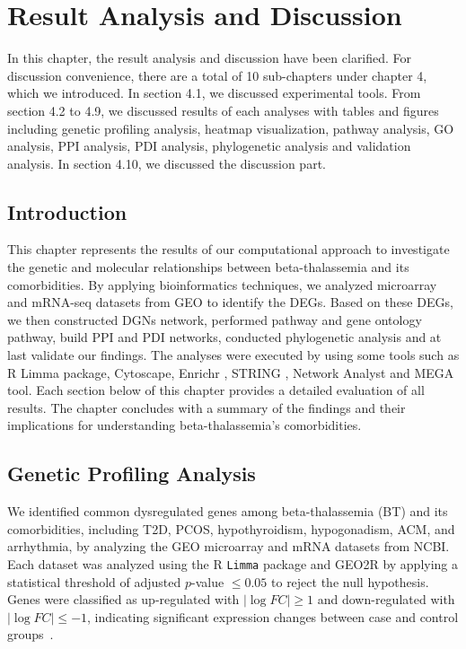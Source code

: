%
%
\let\textcircled=\pgftextcircled
\chapter{Result Analysis and Discussion}
\label{chap:implementation}
In this chapter, the result analysis and discussion have been clarified. For discussion convenience, there are a total of 10 sub-chapters under chapter 4, which we introduced. In section 4.1, we discussed experimental tools. From section 4.2 to 4.9, we discussed results of each analyses with tables and figures including genetic profiling analysis, heatmap visualization, pathway analysis, GO analysis, PPI analysis, PDI analysis, phylogenetic analysis and validation analysis. In section 4.10, we discussed the discussion part.

\vspace{150mm}

\section{Introduction}
\label{sec:sec4_1}
This chapter represents the results of our computational approach to investigate the genetic and molecular relationships between beta-thalassemia and its comorbidities. By applying bioinformatics techniques, we analyzed microarray and mRNA-seq datasets from GEO to identify the DEGs. Based on these DEGs, we then constructed DGNs network, performed pathway and gene ontology pathway, build PPI and PDI networks, conducted phylogenetic analysis and at last validate our findings. The analyses were executed by using some tools such as R Limma package, Cytoscape, Enrichr \cite{b40}, STRING \cite{b40}, Network Analyst \cite{b41} and MEGA tool. Each section below of this chapter provides a detailed evaluation of all results. The chapter concludes with a summary of the findings and their implications for understanding beta-thalassemia's comorbidities.


\section{Genetic Profiling Analysis}
\label{sec:sec4_2}

We identified common dysregulated genes among beta-thalassemia (BT) and its comorbidities, including T2D, PCOS, hypothyroidism, hypogonadism, ACM, and arrhythmia, by analyzing the GEO microarray and mRNA datasets from NCBI. Each dataset was analyzed using the R \texttt{Limma} package and GEO2R by applying a statistical threshold of adjusted \( p \)-value \( \leq 0.05 \) to reject the null hypothesis. Genes were classified as up-regulated with \( \left| \log FC \right| \geq 1 \) and down-regulated with \( \left| \log FC \right| \leq -1 \), indicating significant expression changes between case and control groups~\cite{b4}.

